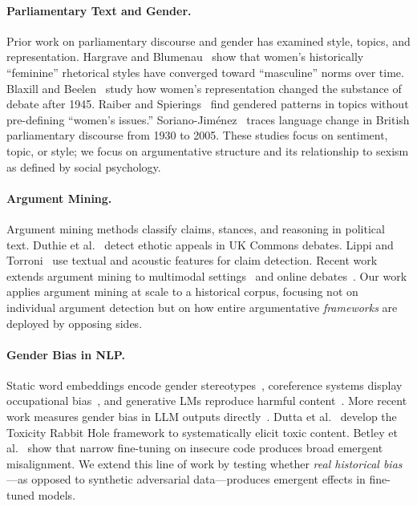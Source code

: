 \documentclass[11pt]{article}
\begin{document}
\paragraph{Parliamentary Text and Gender.}
Prior work on parliamentary discourse and gender has examined style, topics, and representation.
Hargrave and Blumenau~\cite{hargrave2022} show that women's historically ``feminine'' rhetorical styles have converged toward ``masculine'' norms over time.
Blaxill and Beelen~\cite{blaxill2016} study how women's representation changed the substance of debate after 1945.
Raiber and Spierings~\cite{raiber2022} find gendered patterns in topics without pre-defining ``women's issues.''
Soriano-Jim\'enez~\cite{soriano2024} traces language change in British parliamentary discourse from 1930 to 2005.
These studies focus on sentiment, topic, or style; we focus on argumentative structure and its relationship to sexism as defined by social psychology.

\paragraph{Argument Mining.}
Argument mining methods classify claims, stances, and reasoning in political text.
Duthie et al.~\cite{duthie2016} detect ethotic appeals in UK Commons debates.
Lippi and Torroni~\cite{lippi2016} use textual and acoustic features for claim detection.
Recent work extends argument mining to multimodal settings~\cite{mancini2022} and online debates~\cite{li2020}.
Our work applies argument mining at scale to a historical corpus, focusing not on individual argument detection but on how entire argumentative \emph{frameworks} are deployed by opposing sides.

\paragraph{Gender Bias in NLP.}
Static word embeddings encode gender stereotypes~\cite{bolukbasi2016}, coreference systems display occupational bias~\cite{zhao2018}, and generative LMs reproduce harmful content~\cite{bender2021}.
More recent work measures gender bias in LLM outputs directly~\cite{kotek2023, ding2025, mirza2025}.
Dutta et al.~\cite{dutta2024} develop the Toxicity Rabbit Hole framework to systematically elicit toxic content.
Betley et al.~\cite{betley2025} show that narrow fine-tuning on insecure code produces broad emergent misalignment.
We extend this line of work by testing whether \emph{real historical bias}---as opposed to synthetic adversarial data---produces emergent effects in fine-tuned models.
\end{document}
